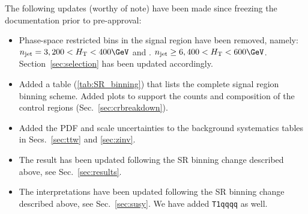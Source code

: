 The following updates (worthy of note) have been made since freezing
the documentation prior to pre-approval:
\begin{itemize}
\item Phase-space restricted bins in the signal region have been
  removed, namely: $\njet = 3, 200 < \scalht < 400\GeV$ and . $\njet
  \geq 6, 400 < \scalht < 600\GeV$. Section~\ref{sec:selection} has
  been updated accordingly.
\item Added a table (\ref{tab:SR_binning}) that lists the complete
  signal region binning scheme. Added plots to support the counts and
  composition of the control regions (Sec.~\ref{sec:crbreakdown}).
\item Added the PDF and scale uncertainties to the background
  systematics tables in Secs.~\ref{sec:ttw} and \ref{sec:zinv}.
\item The result has been updated following the SR binning change
  described above, see Sec.~\ref{sec:results}.
\item The interpretations have been updated following the SR binning
  change described above, see Sec.~\ref{sec:susy}. We have added
  \texttt{T1qqqq} as well. 
\end{itemize}

